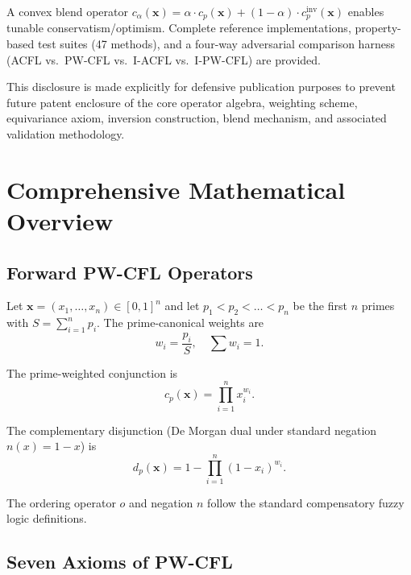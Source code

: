\documentclass[11pt,a4paper]{article}
\begin{document}
A convex blend operator \(c_\alpha(\mathbf{x}) = \alpha \cdot c_p(\mathbf{x}) + (1-\alpha) \cdot c_p^{\text{inv}}(\mathbf{x})\) enables tunable conservatism/optimism. Complete reference implementations, property-based test suites (47 methods), and a four-way adversarial comparison harness (ACFL vs.\ PW-CFL vs.\ I-ACFL vs.\ I-PW-CFL) are provided.

This disclosure is made explicitly for defensive publication purposes to prevent future patent enclosure of the core operator algebra, weighting scheme, equivariance axiom, inversion construction, blend mechanism, and associated validation methodology.

\section{Comprehensive Mathematical Overview}

\subsection{Forward PW-CFL Operators}

Let \(\mathbf{x} = (x_1, \dots, x_n) \in [0,1]^n\) and let \(p_1 < p_2 < \dots < p_n\) be the first \(n\) primes with \(S = \sum_{i=1}^n p_i\). The prime-canonical weights are
\[
w_i = \frac{p_i}{S}, \quad \sum w_i = 1.
\]

The prime-weighted conjunction is
\[
c_p(\mathbf{x}) = \prod_{i=1}^n x_i^{w_i}.
\]

The complementary disjunction (De Morgan dual under standard negation \(n(x) = 1 - x\)) is
\[
d_p(\mathbf{x}) = 1 - \prod_{i=1}^n (1 - x_i)^{w_i}.
\]

The ordering operator \(o\) and negation \(n\) follow the standard compensatory fuzzy logic definitions.

\subsection{Seven Axioms of PW-CFL}
\end{document}
